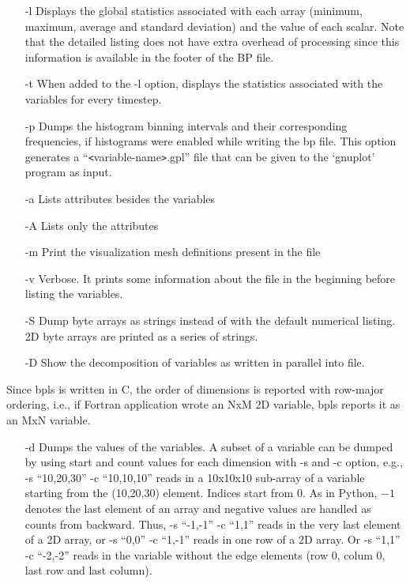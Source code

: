 \begin{itemize}
\item[-l]  Displays the global statistics associated with each array (minimum, maximum, 
average and standard deviation) and the value of each scalar. Note that the detailed 
listing does not have extra overhead of processing since this information is available 
in the footer of the BP file. 

\item[-t]  When added to the -l option, displays the statistics associated with the variables 
for every timestep. 

\item[-p] Dumps the histogram binning intervals and their corresponding frequencies, if 
histograms were enabled while writing the bp file. This option generates a ``\texttt{<}variable-name\texttt{>}.gpl'' 
file that can be given to the `gnuplot' program as input. 

\item[-a] Lists attributes besides the variables

\item[-A] Lists only the attributes

\item[-m] Print the visualization mesh definitions present in the file

%
%

\item[-v] Verbose. It prints some information about the file in the beginning before listing 
the variables. 

\item[-S] Dump byte arrays as strings instead of with the default numerical listing. 2D 
byte arrays are printed as a series of strings. 

\item[-D] Show the decomposition of variables as written in parallel into file. 
\end{itemize}

Since bpls is written in C, the order of dimensions is reported with row-major 
ordering, i.e., if Fortran application wrote an NxM 2D variable, bpls reports it 
as an MxN variable. 

\begin{itemize}
\item[-d] Dumps the values of the variables. A subset of a variable can be dumped by using 
start and count values for each dimension with -s and -c option, e.g., -s ``10,20,30'' 
-c ``10,10,10'' reads in a 10x10x10 sub-array of a variable starting from the (10,20,30) 
element. Indices start from 0. As in Python, $-1$ denotes the last element of 
an array and negative values are handled as counts from backward. Thus, -s ``-1,-1'' 
-c ``1,1'' reads in the very last element of a 2D array, or -s ``0,0'' -c ``1,-1'' 
reads in one row of a 2D array. Or -s ``1,1'' -c ``-2,-2'' reads in the variable 
without the edge elements (row 0, colum 0, last row and last column).
\end{itemize}

